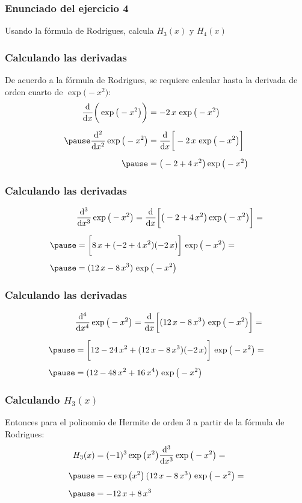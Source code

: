 \documentclass[12pt]{beamer}
\begin{document}
\begin{frame}
\frametitle{Enunciado del ejercicio 4}
Usando la fórmula de Rodrigues, calcula $H_{3} (x)$ y $H_{4} (x)$
\end{frame}
\begin{frame}
\frametitle{Calculando las derivadas}
De acuerdo a la fórmula de Rodrigues, \pause se requiere calcular hasta la derivada de orden cuarto de $\exp\big(- x^{2} \big)$:
\pause
\begin{eqnarray*}
\begin{aligned}
\dv{x} \bigg( \exp\big( - x^{2} \big) \bigg) &= - 2 \, x \, \exp\big( - x^{2} \big) \\[0.5em] \pause
\dv[2]{x} \exp\big( - x^{2} \big) &= \dv{x} \bigg[ - 2 \, x \, \exp\big( - x^{2} \big) \bigg] \\[0.5em] \pause
&= \big( -2 + 4 \, x^{2} \big) \exp\big( - x^{2} \big)
\end{aligned}
\end{eqnarray*}
\end{frame}
\begin{frame}
\frametitle{Calculando las derivadas}
\begin{eqnarray*}
\begin{aligned}
&\dv[3]{x} \exp\big( - x^{2} \big) = \dv{x} \bigg[ \big( -2 + 4 \, x^{2} \big) \exp\big( - x^{2} \big) \bigg] = \\[0.5em] \pause
&= \bigg[ 8 \, x + (-2 + 4 \, x^{2})(- 2 \, x) \bigg] \, \exp\big( - x^{2} \big) = \\[0.5em] \pause
&= (12 \, x - 8 \, x^{3}) \, \exp\big( - x^{2} \big)
\end{aligned}
\end{eqnarray*}
\end{frame}
\begin{frame}
\frametitle{Calculando las derivadas}
\begin{eqnarray*}
\begin{aligned}
&\dv[4]{x} \exp\big( - x^{2} \big) = \dv{x} \bigg[ (12 \, x - 8 \, x^{3}) \, \exp\big( - x^{2} \big) \bigg] = \\[0.5em] \pause
&= \bigg[ 12 - 24 \, x^{2} + (12 \, x - 8 \, x^{3}) (-2 \, x) \bigg] \, \exp\big( - x^{2} \big) = \\[0.5em] \pause
&= (12 - 48 \, x^{2} + 16 \, x^{4}) \, \exp\big( - x^{2} \big)
\end{aligned}
\end{eqnarray*}
\end{frame}
\begin{frame}
\frametitle{Calculando $H_{3} (x)$}
Entonces para el polinomio de Hermite de orden 3 a partir de la fórmula de Rodrigues:
\pause
\begin{eqnarray*}
\begin{aligned}
H_{3} (x) &= (-1)^{3} \exp\big( x^{2} \big) \dv[3]{x} \exp\big( - x^{2} \big) = \\[0.5em] \pause
&= - \exp\big( x^{2} \big) \, (12 \, x - 8 \, x^{3}) \, \exp\big( - x^{2} \big) = \\[0.5em] \pause
&= - 12 \, x + 8 \, x^{3}
\end{aligned}
\end{eqnarray*}
\end{frame}
\end{document}
